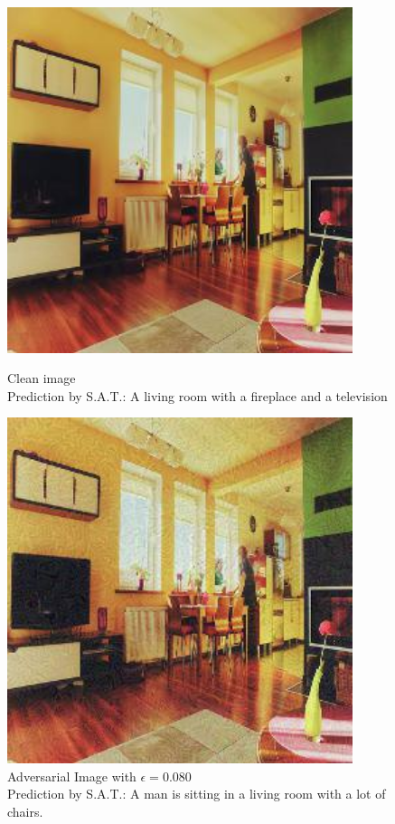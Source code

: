 \begin{figure}[ht]
    \centering
    \begin{minipage}{0.45\textwidth}
        \centering
        \includegraphics[width=0.9\textwidth]{../code/ShowDistractAndDeceive/samples/0.000/img_0.jpg} %
        \caption*{Clean image\\Prediction by S.A.T.: A living room with a fireplace and a television}
    \end{minipage}\hfill
    \begin{minipage}{0.45\textwidth}
        \centering
        \includegraphics[width=0.9\textwidth]{../code/ShowDistractAndDeceive/samples/0.080/img_0.jpg} %
        \caption*{Adversarial Image with $\epsilon=0.080$\\Prediction by S.A.T.: A man is sitting in a living room with a lot of chairs.}
    \end{minipage}
\end{figure}

